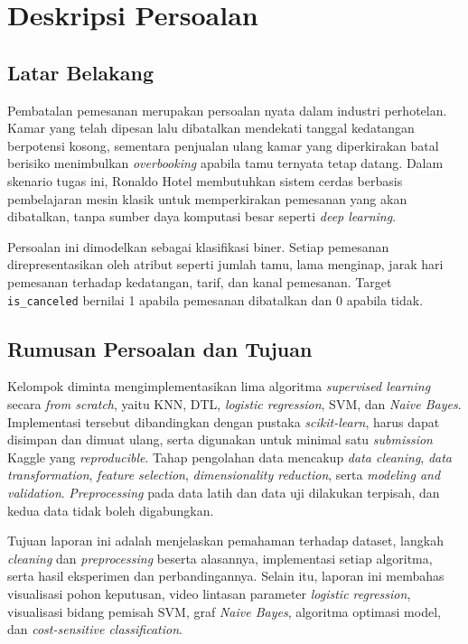\section{Deskripsi Persoalan}
\subsection{Latar Belakang}
Pembatalan pemesanan merupakan persoalan nyata dalam industri perhotelan. Kamar yang telah dipesan lalu dibatalkan mendekati tanggal kedatangan berpotensi kosong, sementara penjualan ulang kamar yang diperkirakan batal berisiko menimbulkan \textit{overbooking} apabila tamu ternyata tetap datang. Dalam skenario tugas ini, Ronaldo Hotel\texttrademark{} membutuhkan sistem cerdas berbasis pembelajaran mesin klasik untuk memperkirakan pemesanan yang akan dibatalkan, tanpa sumber daya komputasi besar seperti \textit{deep learning}.

Persoalan ini dimodelkan sebagai klasifikasi biner. Setiap pemesanan direpresentasikan oleh atribut seperti jumlah tamu, lama menginap, jarak hari pemesanan terhadap kedatangan, tarif, dan kanal pemesanan. Target \texttt{is\_canceled} bernilai 1 apabila pemesanan dibatalkan dan 0 apabila tidak.

\subsection{Rumusan Persoalan dan Tujuan}
Kelompok diminta mengimplementasikan lima algoritma \textit{supervised learning} secara \textit{from scratch}, yaitu KNN, DTL, \textit{logistic regression}, SVM, dan \textit{Naive Bayes}. Implementasi tersebut dibandingkan dengan pustaka \textit{scikit-learn}, harus dapat disimpan dan dimuat ulang, serta digunakan untuk minimal satu \textit{submission} Kaggle yang \textit{reproducible}. Tahap pengolahan data mencakup \textit{data cleaning}, \textit{data transformation}, \textit{feature selection}, \textit{dimensionality reduction}, serta \textit{modeling and validation}. \textit{Preprocessing} pada data latih dan data uji dilakukan terpisah, dan kedua data tidak boleh digabungkan.

Tujuan laporan ini adalah menjelaskan pemahaman terhadap dataset, langkah \textit{cleaning} dan \textit{preprocessing} beserta alasannya, implementasi setiap algoritma, serta hasil eksperimen dan perbandingannya. Selain itu, laporan ini membahas visualisasi pohon keputusan, video lintasan parameter \textit{logistic regression}, visualisasi bidang pemisah SVM, graf \textit{Naive Bayes}, algoritma optimasi model, dan \textit{cost-sensitive classification}.

